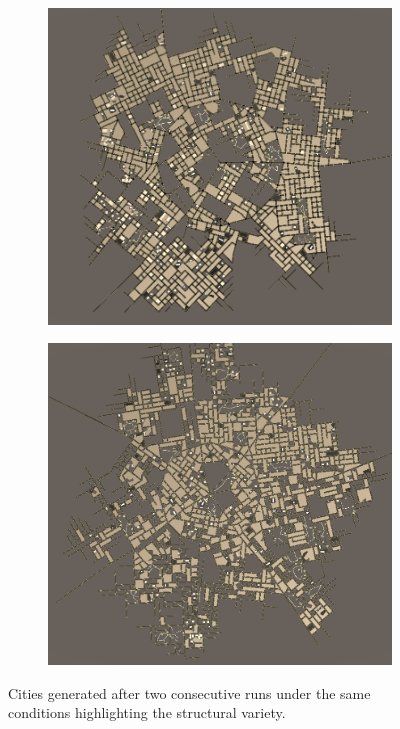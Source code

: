 \begin{figure}[h!]
  \centering
  \begin{subfigure}[b]{0.455\textwidth}
    \includegraphics[width=\textwidth]{figure/discussion_city_layout_1}
  \end{subfigure}
  \quad
  \begin{subfigure}[b]{0.45\textwidth}
    \includegraphics[width=\textwidth]{figure/discussion_city_layout_2}
  \end{subfigure}
  \caption{Cities generated after two consecutive runs under the same conditions highlighting the structural variety.}
  \label{fig:discussion_city_layout_variety}
\end{figure}

